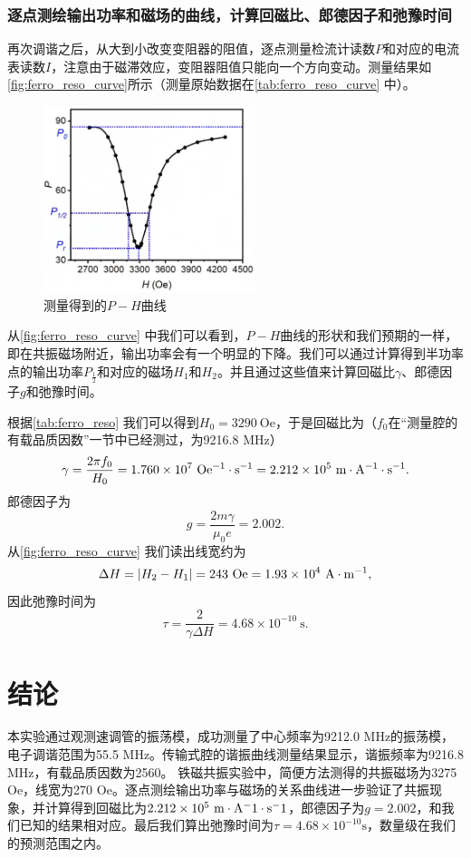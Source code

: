 \documentclass[font=default]{mpltx}
\begin{document}
\subsubsection{逐点测绘输出功率和磁场的曲线，计算回磁比、郎德因子和弛豫时间}
再次调谐之后，从大到小改变变阻器的阻值，逐点测量检流计读数$P$和对应的电流表读数$I$，注意由于磁滞效应，变阻器阻值只能向一个方向变动。测量结果如\autoref{fig:ferro_reso_curve}所示（测量原始数据在\autoref{tab:ferro_reso_curve} 中）。
\begin{figure}
  \centering
  \includegraphics[width=0.55\textwidth]{fig/P-H_relation_exp.png}
  \caption{测量得到的$P-H$曲线}
  \label{fig:ferro_reso_curve}
\end{figure}

从\autoref{fig:ferro_reso_curve} 中我们可以看到，$P-H$曲线的形状和我们预期的一样，即在共振磁场附近，输出功率会有一个明显的下降。我们可以通过计算得到半功率点的输出功率$P_{\frac12}$和对应的磁场$H_1$和$H_2$。并且通过这些值来计算回磁比$\gamma$、郎德因子$g$和弛豫时间。

根据\autoref{tab:ferro_reso} 我们可以得到$H_0=3290\ \text{Oe}$，于是回磁比为（$f_0$在“测量腔的有载品质因数”一节中已经测过，为9216.8 MHz）$$\gamma=\frac{2\pi f_0}{H_0}=1.760\times 10^{7}\ {\rm Oe^{-1}\cdot s^{-1}}=2.212\times10^{5}\ {\rm m\cdot A^{-1}\cdot s^{-1}}.$$
郎德因子为$$g=\frac{2m\gamma}{\mu_0e}=2.002.$$
从\autoref{fig:ferro_reso_curve} 我们读出线宽约为$$\Delta H=|H_2-H_1|=243\ \text{Oe}=1.93\times 10^{4}\ {\rm A\cdot m^{-1}},$$因此弛豫时间为$$\tau=\frac{2}{\gamma\Delta H}=4.68\times 10^{-10}\ \text{s}.$$

\section{结论}
本实验通过观测速调管的振荡模，成功测量了中心频率为9212.0 MHz的振荡模，电子调谐范围为55.5 MHz。传输式腔的谐振曲线测量结果显示，谐振频率为9216.8 MHz，有载品质因数为2560。
铁磁共振实验中，简便方法测得的共振磁场为3275 Oe，线宽为270 Oe。逐点测绘输出功率与磁场的关系曲线进一步验证了共振现象，并计算得到回磁比为$2.212\times10^5\ {\rm m\cdot A^-1\cdot s^-1}$，郎德因子为$g=2.002$，和我们已知的结果相对应。最后我们算出弛豫时间为$\tau =4.68\times10^{-10} \text{s}$，数量级在我们的预测范围之内。
\end{document}
